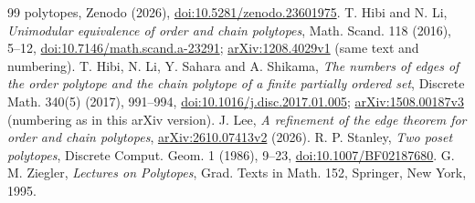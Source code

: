 \documentclass[11pt]{article}
\theoremstyle{definition}
\theoremstyle{remark}
\begin{document}
\begin{footnotesize}
\begin{thebibliography}{99}
{polytopes}, Zenodo (2026),
\href{https://doi.org/10.5281/zenodo.23601975}{doi:10.5281/zenodo.23601975}.
 T. Hibi and N. Li,
\emph{Unimodular equivalence of order and chain polytopes},
Math. Scand. 118 (2016), 5--12,
\href{https://doi.org/10.7146/math.scand.a-23291}{doi:10.7146/math.scand.a-23291};
\href{https://arxiv.org/abs/1208.4029v1}{arXiv:1208.4029v1} (same
text and numbering).
 T. Hibi, N. Li, Y. Sahara and A. Shikama,
\emph{The numbers of edges of the order polytope and the chain polytope
of a finite partially ordered set}, Discrete Math. 340(5) (2017),
991--994, \href{https://doi.org/10.1016/j.disc.2017.01.005}{doi:10.1016/j.disc.2017.01.005}; \href{https://arxiv.org/abs/1508.00187v3}{arXiv:1508.00187v3} (numbering as in this arXiv version).
 J. Lee, \emph{A refinement of the edge theorem for order
and chain polytopes},
\href{https://arxiv.org/abs/2610.07413v2}{arXiv:2610.07413v2} (2026).
 R. P. Stanley, \emph{Two poset polytopes}, Discrete
Comput. Geom. 1 (1986), 9--23, \href{https://doi.org/10.1007/BF02187680}{doi:10.1007/BF02187680}.
 G. M. Ziegler, \emph{Lectures on Polytopes}, Grad.
Texts in Math. 152, Springer, New York, 1995.
\end{thebibliography}
\end{footnotesize}
\end{document}
